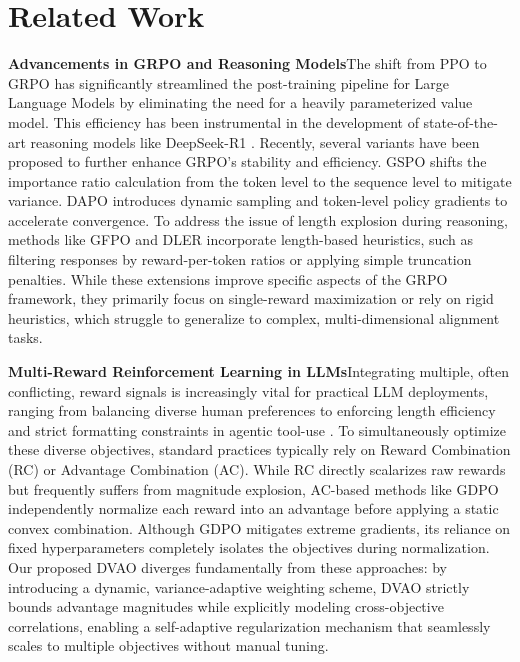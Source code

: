\section{Related Work}

\textbf{Advancements in GRPO and Reasoning Models}\quad The shift from PPO \citep{ppo} to GRPO \citep{grpo} has significantly streamlined the post-training pipeline for Large Language Models by eliminating the need for a heavily parameterized value model. This efficiency has been instrumental in the development of state-of-the-art reasoning models like DeepSeek-R1 \citep{deepseek-r1}. Recently, several variants have been proposed to further enhance GRPO’s stability and efficiency. GSPO \citep{gspo} shifts the importance ratio calculation from the token level to the sequence level to mitigate variance. DAPO \citep{dapo} introduces dynamic sampling and token-level policy gradients to accelerate convergence. To address the issue of length explosion during reasoning, methods like GFPO \citep{gfpo} and DLER \citep{dler} incorporate length-based heuristics, such as filtering responses by reward-per-token ratios or applying simple truncation penalties. While these extensions improve specific aspects of the GRPO framework, they primarily focus on single-reward maximization or rely on rigid heuristics, which struggle to generalize to complex, multi-dimensional alignment tasks.

\textbf{Multi-Reward Reinforcement Learning in LLMs}\quad Integrating multiple, often conflicting, reward signals is increasingly vital for practical LLM deployments, ranging from balancing diverse human preferences \citep{alarm, jang2023personalized} to enforcing length efficiency \citep{gfpo, dler, luo2025o1} and strict formatting constraints in agentic tool-use \citep{toolrl, xlam}. To simultaneously optimize these diverse objectives, standard practices typically rely on Reward Combination (RC) or Advantage Combination (AC). While RC directly scalarizes raw rewards but frequently suffers from magnitude explosion, AC-based methods like GDPO \citep{gdpo} independently normalize each reward into an advantage before applying a static convex combination. Although GDPO mitigates extreme gradients, its reliance on fixed hyperparameters completely isolates the objectives during normalization. Our proposed DVAO diverges fundamentally from these approaches: by introducing a dynamic, variance-adaptive weighting scheme, DVAO strictly bounds advantage magnitudes while explicitly modeling cross-objective correlations, enabling a self-adaptive regularization mechanism that seamlessly scales to multiple objectives without manual tuning.